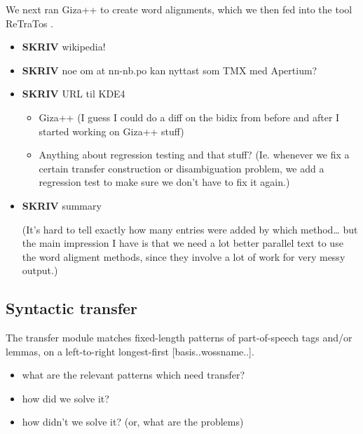 \documentclass[11pt]{article}
\begin{document}
We next ran Giza++ \citep{och2003scv} to create word alignments, which
we then fed into the tool ReTraTos \citep{caseli2006aib}.

\begin{itemize}

\item \textbf{SKRIV} wikipedia!\\
\label{sec-3.4.1}


\item \textbf{SKRIV} noe om at nn-nb.po kan nyttast som TMX med Apertium?\\
\label{sec-3.4.2}




\item \textbf{SKRIV} URL til KDE4\\
\label{sec-3.4.3}


\begin{itemize}
\item Giza++ (I guess I could do a diff on the bidix from before and after
  I started working on Giza++ stuff)
\item Anything about regression testing and that stuff? (Ie. whenever we
  fix a certain transfer construction or disambiguation problem, we
  add a regression test to make sure we don't have to fix it again.)
\end{itemize}

\item \textbf{SKRIV} summary\\
\label{sec-3.4.4}

(It's hard to tell exactly how many entries were added by which
method\ldots{} but the main impression I have is that we need a lot better
parallel text to use the word aligment methods, since they involve a
lot of work for very messy output.)

\end{itemize} %
\subsection{Syntactic transfer}
\label{sec-3.5}

The transfer module matches fixed-length patterns of part-of-speech
tags and/or lemmas, on a left-to-right longest-first
[basis..wossname..]. 

\begin{itemize}
\item what are the relevant patterns which need transfer?
\item how did we solve it?
\item how didn't we solve it? (or, what are the problems)
\end{itemize}
\end{document}
